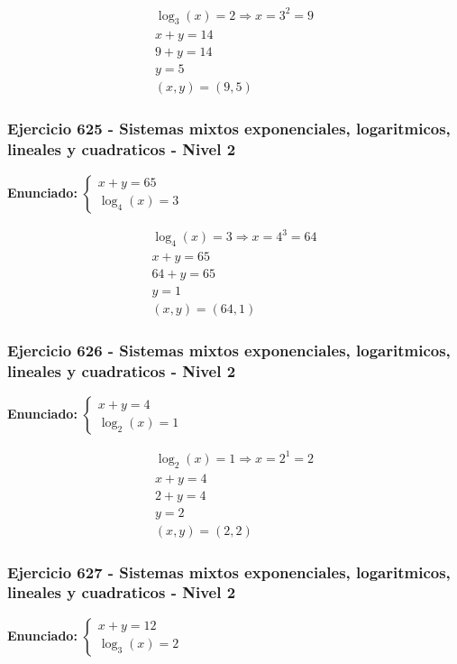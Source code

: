 \documentclass[12pt,a4paper]{article}
\begin{document}
\[
\begin{aligned}
\log_{3}\left(x\right)=2\Rightarrow x=3^{2}=9\\
x+y=14\\
9+y=14\\
y=5\\
\boxed{(x,y)=(9,5)}
\end{aligned}
\]


\subsubsection*{Ejercicio 625 - Sistemas mixtos exponenciales, logaritmicos, lineales y cuadraticos - Nivel 2}
\textbf{Enunciado:} \(\begin{cases} x+y=65\\ \log_{4}\left(x\right)=3\end{cases}\)

\[
\begin{aligned}
\log_{4}\left(x\right)=3\Rightarrow x=4^{3}=64\\
x+y=65\\
64+y=65\\
y=1\\
\boxed{(x,y)=(64,1)}
\end{aligned}
\]


\subsubsection*{Ejercicio 626 - Sistemas mixtos exponenciales, logaritmicos, lineales y cuadraticos - Nivel 2}
\textbf{Enunciado:} \(\begin{cases} x+y=4\\ \log_{2}\left(x\right)=1\end{cases}\)

\[
\begin{aligned}
\log_{2}\left(x\right)=1\Rightarrow x=2^{1}=2\\
x+y=4\\
2+y=4\\
y=2\\
\boxed{(x,y)=(2,2)}
\end{aligned}
\]


\subsubsection*{Ejercicio 627 - Sistemas mixtos exponenciales, logaritmicos, lineales y cuadraticos - Nivel 2}
\textbf{Enunciado:} \(\begin{cases} x+y=12\\ \log_{3}\left(x\right)=2\end{cases}\)
\end{document}
